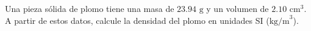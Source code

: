 \item Una pieza sólida de plomo tiene una masa de $23.94 \text{ g}$ y un volumen de $2.10 \text{ cm}^3$. A partir de estos datos, calcule la densidad del plomo en unidades SI ($\text{kg/m}^3$).
